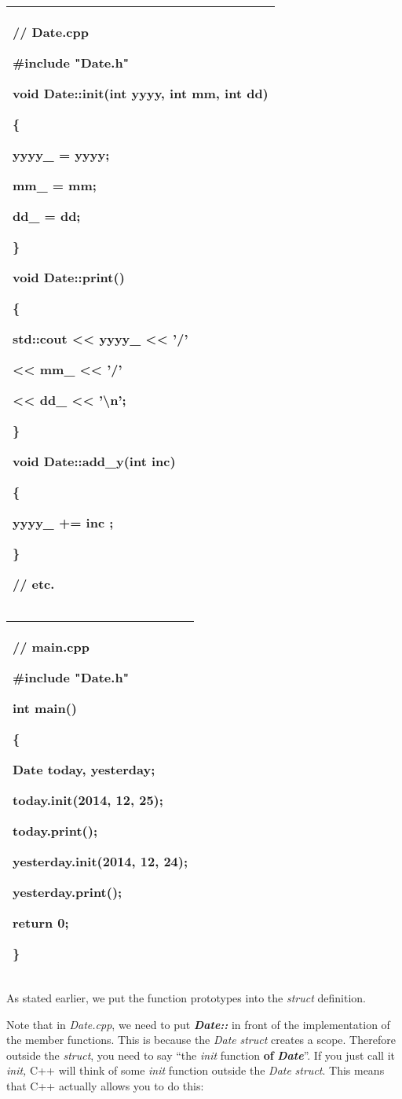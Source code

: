 \documentclass[
]{article}
\begin{document}
\begin{longtable}[]{@{}l@{}}
\toprule
\endhead
\begin{minipage}[t]{0.97\columnwidth}\raggedright
// Date.cpp

\#include "Date.h"

void Date::init(int yyyy, int mm, int dd)

\{

yyyy\_ = yyyy;

mm\_ = mm;

dd\_ = dd;

\}

void Date::print()

\{

std::cout \textless\textless{} yyyy\_ \textless\textless{} '/'

\textless\textless{} mm\_ \textless\textless{} '/'

\textless\textless{} dd\_ \textless\textless{} '\textbackslash n';

\}

void Date::add\_y(int inc)

\{

yyyy\_ += inc ;

\}

// etc.\strut
\end{minipage}\tabularnewline
\bottomrule
\end{longtable}

\begin{longtable}[]{@{}l@{}}
\toprule
\endhead
\begin{minipage}[t]{0.97\columnwidth}\raggedright
// main.cpp

\#include "Date.h"

int main()

\{

Date today, yesterday;

\textbf{today.init(2014, 12, 25);}

today.print();

yesterday.init(2014, 12, 24);

yesterday.print();

return 0;

\}\strut
\end{minipage}\tabularnewline
\bottomrule
\end{longtable}

As stated earlier, we put the function prototypes into the \emph{struct}
definition.

Note that in \emph{Date.cpp}, we need to put \emph{\textbf{Date::}} in
front of the implementation of the member functions. This is because the
\emph{Date} \emph{struct} creates a scope. Therefore outside the
\emph{struct}, you need to say ``the \emph{init} function \textbf{of
}\emph{\textbf{Date}}''. If you just call it \emph{init,} C++ will think
of some \emph{init} function outside the \emph{Date} \emph{struct}. This
means that C++ actually allows you to do this:
\end{document}

